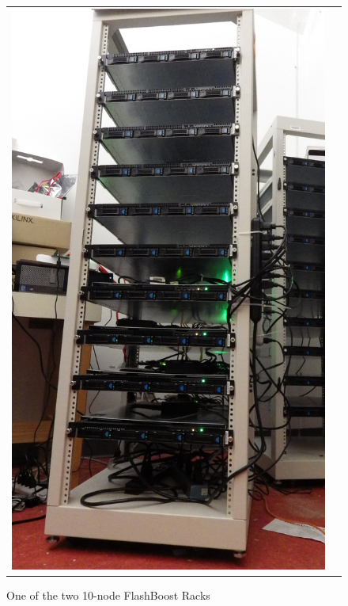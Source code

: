 \begin{figure}[ht!]
	\begin{tabular}{cc}

	\multirow{2}{*}{
	\begin{minipage}[c]{.22\textwidth}
	\includegraphics[width=\textwidth]{figures/rackserver2.jpg}
	\caption{One of the two 10-node FlashBoost Racks}
	\label{fig:bluedbmcluster}
	\end{minipage}
	}
	& 
	\begin{minipage}[c]{.22\textwidth}

\end{minipage}
\end{tabular}
\end{figure}
